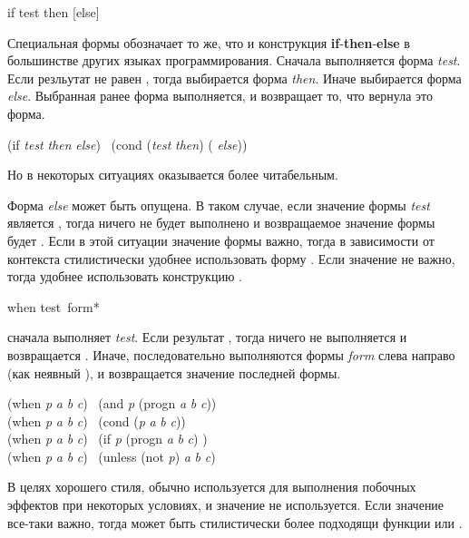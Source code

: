 \begin{defspec}
if test then [else]

Специальная формы  обозначает то же, что и конструкция
\textbf{if}-\textbf{then}-\textbf{else} в большинстве других языках
программирования.
Сначала выполняется форма \emph{test}. Если резльутат не равен {\false}, тогда
выбирается форма \emph{then}. Иначе выбирается форма \emph{else}.
Выбранная ранее форма выполняется, и  возвращает то, что вернула это
форма.
\begin{lisp}
(if \emph{test} \emph{then} \emph{else}) \EQ\ (cond (\emph{test} \emph{then}) ({\true} \emph{else}))
\end{lisp}
Но в некоторых ситуациях  оказывается более читабельным.

Форма \emph{else} может быть опущена. В таком случае, если значение формы
\emph{test} является {\false}, тогда ничего не будет выполнено и возвращаемое
значение формы  будет {\false}.
Если в этой ситуации значение формы  важно, тогда в зависимости от
контекста стилистически удобнее использовать форму .
Если значение не важно, тогда удобнее использовать конструкцию .
\end{defspec}

\begin{defmac}
when test {\,form}*

сначала выполняет \emph{test}. Если результат {\false}, тогда ничего не
выполняется и возвращается {\false}.
Иначе, последовательно выполняются формы \emph{form}
слева направо (как неявный ), и возвращается значение последней
формы.
\begin{lisp}
(when \emph{p} \emph{a} \emph{b} \emph{c}) \EQ\ (and \emph{p} (progn \emph{a} \emph{b} \emph{c})) \\
(when \emph{p} \emph{a} \emph{b} \emph{c}) \EQ\ (cond (\emph{p} \emph{a} \emph{b} \emph{c})) \\
(when \emph{p} \emph{a} \emph{b} \emph{c}) \EQ\ (if \emph{p} (progn \emph{a} \emph{b} \emph{c}) {\false}) \\
(when \emph{p} \emph{a} \emph{b} \emph{c}) \EQ\ (unless (not \emph{p}) \emph{a} \emph{b} \emph{c})
\end{lisp}
В целях хорошего стиля,  обычно используется для выполнения побочных
эффектов при некоторых условиях, и значение  не используется.
Если значение все-таки важно, тогда может быть стилистически более подходящи
функции  или .
\end{defmac}


